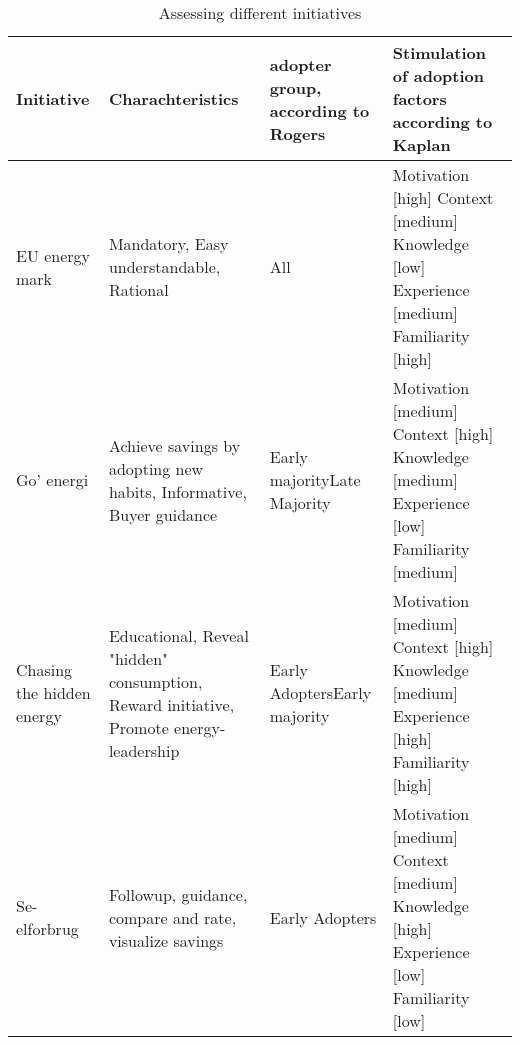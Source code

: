 \documentclass[journal]{IEEEtran}
\begin{document}
\begin{table*}[t2]

\caption{Assessing different initiatives} %
\centering  %

\begin{tabular}{|p{} |p{3.5cm} |p{2.5cm} |p{4.5cm} |} %
\hline\hline                        %

Initiative & Charachteristics & adopter group, according to Rogers & Stimulation of adoption factors according to Kaplan\\ [0.5ex] %
\hline                  %

EU energy mark & 
Mandatory, Easy understandable, Rational  & 
All &
Motivation  [high] \newline 
Context	    [medium] \newline 
Knowledge	[low] \newline 
Experience  [medium] \newline 
Familiarity [high] \\
\hline

Go' energi & 
Achieve savings by adopting new habits, Informative, Buyer guidance & 
Early majority\newline  Late Majority &
Motivation  [medium] \newline 
Context	    [high] \newline 
Knowledge	[medium] \newline 
Experience  [low] \newline 
Familiarity [medium] \\
\hline

Chasing the hidden energy & 
Educational, Reveal "hidden" consumption, Reward initiative, Promote energy-leadership & Early Adopters\newline Early majority &
Motivation  [medium] \newline 
Context	    [high] \newline 
Knowledge	[medium] \newline 
Experience  [high] \newline 
Familiarity [high] \\
\hline

Se-elforbrug & 
Followup, guidance, compare and rate, visualize savings  & 
Early Adopters &
Motivation  [medium] \newline 
Context	    [medium] \newline 
Knowledge	[high] \newline 
Experience  [low] \newline 
Familiarity [low] \\
\hline
\end{tabular}
\label{table:asses_init} %
\end{table*}
\end{document}
